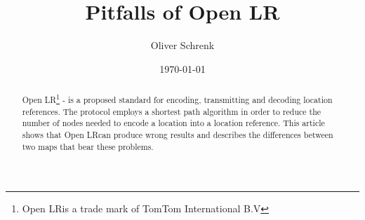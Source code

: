 \title{Pitfalls of Open LR\tm} 
\author{Oliver Schrenk} 
\date{\today}

\maketitle

\begin{abstract}
Open LR\tm\footnote{Open LR\tm is a trade mark of TomTom International B.V} - is a proposed standard for encoding, transmitting and decoding location references. The protocol employs a shortest path algorithm in order to reduce the number of nodes needed to encode a location into a location reference. This article shows that Open LR\tm can produce wrong results and describes the differences between two maps that bear these problems.
\end{abstract}
